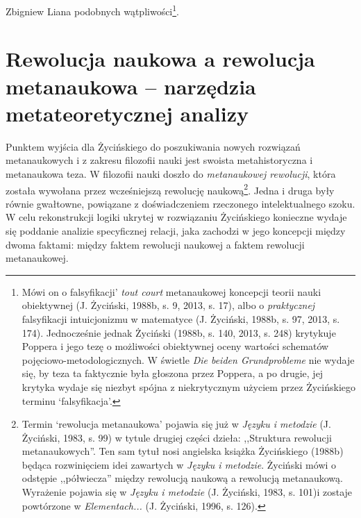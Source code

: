 \begin{artplenv}{Zbigniew Liana}
podobnych wątpliwości\footnote{Mówi on o falsyfikacji' \textit{tout court} metanaukowej koncepcji teorii nauki
obiektywnej \label{ref:RNDwQZn2Zd98X}(J. Życiński, 1988b, s. 9, 2013, s. 17), albo o \textit{praktycznej} falsyfikacji
intuicjonizmu w matematyce \label{ref:RNDF7UBvcuK26}(J. Życiński, 1988b, s. 97, 2013, s. 174). Jednocześnie jednak
Życiński \label{ref:RNDhVrobTs8jG}(1988b, s. 140, 2013, s. 248) krytykuje Poppera i jego tezę o możliwości obiektywnej
oceny wartości schematów pojęciowo-metodologicznych. W świetle \textit{Die beiden Grundprobleme} nie wydaje się, by teza
ta faktycznie była głoszona przez Poppera, a po drugie, jej krytyka wydaje się niezbyt spójna z niekrytycznym użyciem
przez Życińskiego terminu `falsyfikacja'.}.

\section{Rewolucja naukowa a rewolucja metanaukowa -- narzędzia metateoretycznej analizy}

Punktem wyjścia dla Życińskiego do poszukiwania nowych rozwiązań metanaukowych i z zakresu filozofii nauki jest swoista
metahistoryczna i metanaukowa teza. W filozofii nauki doszło do \textit{metanaukowej rewolucji}, która została wywołana
przez wcześniejszą rewolucję naukową\footnote{Termin `rewolucja metanaukowa' pojawia się już w \textit{Języku i metodzie}
\label{ref:RNDX1VVM27OlW}(J. Życiński, 1983, s. 99) w tytule drugiej części dzieła: ,,Struktura rewolucji
metanaukowych''. Ten sam tytuł nosi angielska książka Życińskiego \label{ref:RNDZhnNjGxqOR}(1988b) będąca rozwinięciem
idei zawartych w \textit{Języku i metodzie}. Życiński mówi o odstępie ,,półwiecza'' między rewolucją naukową a rewolucją
metanaukową. Wyrażenie pojawia się w \textit{Języku i metodzie} \label{ref:RNDIDOT0gvEdV}(J. Życiński, 1983, s. 101)i
zostaje powtórzone w \textit{Elementach...}  \label{ref:RNDTq4UOwaMNQ}(J. Życiński, 1996, s. 126).}. Jedna i druga były
równie gwałtowne, powiązane z doświadczeniem rzeczonego intelektualnego szoku. W celu rekonstrukcji logiki ukrytej w rozwiązaniu
Życińskiego konieczne wydaje się poddanie analizie specyficznej relacji, jaka zachodzi w jego koncepcji
między dwoma faktami: między faktem rewolucji naukowej a faktem rewolucji metanaukowej.


\end{artplenv}
